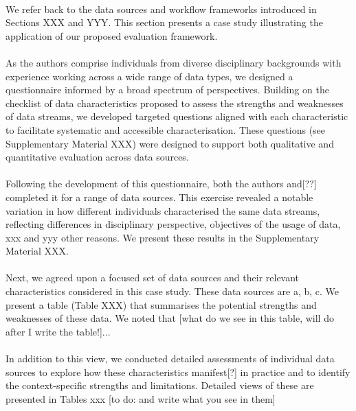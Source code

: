 \documentclass{article}
\begin{document}
\paragraph{}We refer back to the data sources and workflow frameworks introduced in Sections XXX and YYY. This section presents a case study illustrating the application of our proposed evaluation framework. 

\paragraph{}As the authors comprise individuals from diverse disciplinary backgrounds with experience working across a wide range of data types, we designed a questionnaire informed by a broad spectrum of perspectives. Building on the checklist of data characteristics proposed to assess the strengths and weaknesses of data streams, we developed targeted questions aligned with each characteristic to facilitate systematic and accessible characterisation. These questions (see Supplementary Material XXX) were designed to support both qualitative and quantitative evaluation across data sources. 

\paragraph{}Following the development of this questionnaire, both the authors and[??] completed it for a range of data sources. This exercise revealed a notable variation in how different individuals characterised the same data streams, reflecting differences in disciplinary perspective, objectives of the usage of data, xxx and yyy other reasons. We present these results in the Supplementary Material XXX. 

\paragraph{}Next, we agreed upon a focused set of data sources and their relevant characteristics considered in this case study. These data sources are a, b, c. We present a table (Table XXX) that summarises the potential strengths and weaknesses of these data. We noted that [what do we see in this table, will do after I write the table!]... 

\paragraph{}In addition to this view, we conducted detailed assessments of individual data sources to explore how these characteristics manifest[?] in practice and to identify the context-specific strengths and limitations. Detailed views of these are presented in Tables xxx [to do: and write what you see in them]
\end{document}
